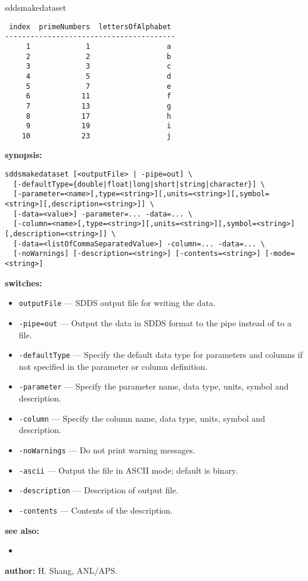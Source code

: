 \begin{sddsprog}{sddsmakedataset}
\begin{verbatim}
 index  primeNumbers  lettersOfAlphabet
----------------------------------------
     1             1                  a
     2             2                  b
     3             3                  c
     4             5                  d
     5             7                  e
     6            11                  f
     7            13                  g
     8            17                  h
     9            19                  i
    10            23                  j
\end{verbatim}
\item \textbf{synopsis:}
\begin{verbatim}
sddsmakedataset [<outputFile> | -pipe=out] \
  [-defaultType={double|float|long|short|string|character}] \
  [-parameter=<name>[,type=<string>][,units=<string>][,symbol=<string>][,description=<string>]] \
  [-data=<value>] -parameter=... -data=... \
  [-column=<name>[,type=<string>][,units=<string>][,symbol=<string>][,description=<string>]] \
  [-data=<listOfCommaSeparatedValue>] -column=... -data=... \
  [-noWarnings] [-description=<string>] [-contents=<string>] [-mode=<string>]
\end{verbatim}
\item \textbf{switches:}
\begin{itemize}
  \item \verb|outputFile| --- SDDS output file for writing the data.
  \item \verb|-pipe=out| --- Output the data in SDDS format to the pipe instead of to a file.
  \item \verb|-defaultType| --- Specify the default data type for parameters and columns if not specified in the parameter or column definition.
  \item \verb|-parameter| --- Specify the parameter name, data type, units, symbol and description.
  \item \verb|-column| --- Specify the column name, data type, units, symbol and description.
  \item \verb|-noWarnings| --- Do not print warning messages.
  \item \verb|-ascii| --- Output the file in ASCII mode; default is binary.
  \item \verb|-description| --- Description of output file.
  \item \verb|-contents| --- Contents of the description.
\end{itemize}
\item \textbf{see also:}
\begin{itemize}
  \item \progref{sddsprintout}
\end{itemize}
\item \textbf{author:} H. Shang, ANL/APS.
\end{sddsprog}
